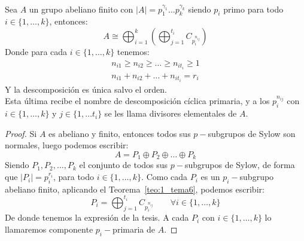 \begin{teo}\label{teo:2_tema6}\ \\
    Sea $A$ un grupo abeliano finito con $|A| = p_1^{\gamma_1}\ldots p_k^{\gamma_k}$ siendo $p_i$ primo para todo $i \in \{1,\ldots,k\}$, entonces:
    \begin{equation*}
        A \cong \bigoplus_{i=1}^k \left(\bigoplus_{j=1}^{t_i} C_{p_i^{n_{ij}}}\right)
    \end{equation*}
    Donde para cada $i \in \{1,\ldots,k\}$ tenemos:
    \begin{align*}
        n_{i1} \geq n_{i2} \geq \ldots \geq n_{it_{i}} \geq 1 \\
        n_{i1} + n_{i2} + \ldots + n_{it_{i}} = r_i
    \end{align*}
    Y la descomposición es única salvo el orden.\\

    \noindent
    Esta última recibe el nombre de descomposición cíclica primaria, y a los $p_i^{n_{ij}}$ con $i \in \{1,\ldots,k\}$ y $j \in \{1,\ldots t_i\}$ se les llama divisores elementales de $A$.\newline
    \begin{proof}
        Si $A$ es abeliano y finito, entonces todos sus $p-$subgrupos de Sylow son normales, luego podemos escribir:
        \begin{equation*}
            A = P_1 \oplus P_2 \oplus \ldots \oplus P_k
        \end{equation*}
        Siendo ${P_1, P_2, \ldots, P_k}$ el conjunto de todos sus $p-$subgrupos de Sylow, de forma que $|P_i| = p_i^{r_i}$, para todo $i \in \{1,\ldots,k\}$. Como cada $P_i$ es un $p_i-$subgrupo abeliano finito, aplicando el Teorema~\ref{teo:1_tema6}, podemos escribir:
        \begin{equation*}
            P_i = \bigoplus_{j=1}^{t_i} C_{p_i^{n_{ij}}} \qquad \forall i \in \{1,\ldots,k\}
        \end{equation*}
        De donde tenemos la expresión de la tesis.\newline
        A cada $P_i$ con $i \in \{1,\ldots,k\}$ lo llamaremos componente $p_i-$primaria de $A$.
    \end{proof}
\end{teo}

